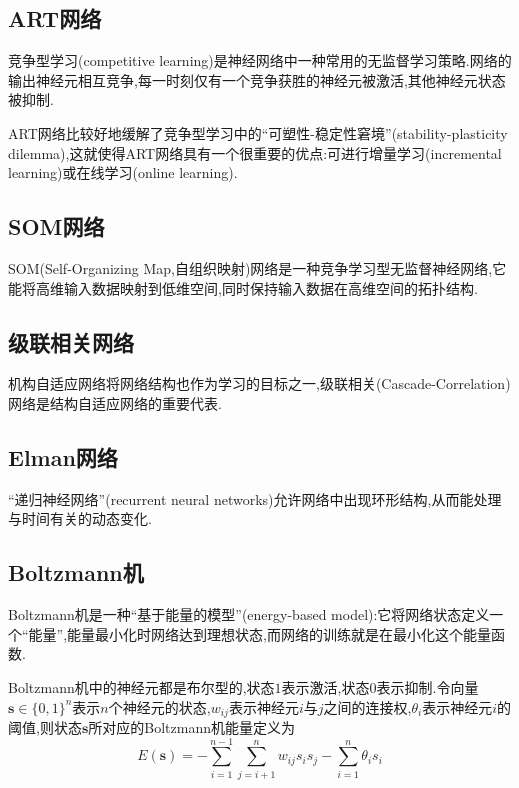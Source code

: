 \subsection{ART网络}

竞争型学习(competitive learning)是神经网络中一种常用的无监督学习策略.网络的输出神经元相互竞争,每一时刻仅有一个竞争获胜的神经元被激活,其他神经元状态被抑制.

ART网络比较好地缓解了竞争型学习中的``可塑性-稳定性窘境''(stability-plasticity dilemma),这就使得ART网络具有一个很重要的优点:可进行增量学习(incremental learning)或在线学习(online learning).

\subsection{SOM网络}

SOM(Self-Organizing Map,自组织映射)网络是一种竞争学习型无监督神经网络,它能将高维输入数据映射到低维空间,同时保持输入数据在高维空间的拓扑结构.

\subsection{级联相关网络}

机构自适应网络将网络结构也作为学习的目标之一,级联相关(Cascade-Correlation)网络是结构自适应网络的重要代表.

\subsection{Elman网络}

``递归神经网络''(recurrent neural networks)允许网络中出现环形结构,从而能处理与时间有关的动态变化.

\subsection{Boltzmann机}

Boltzmann机是一种``基于能量的模型''(energy-based model):它将网络状态定义一个``能量'',能量最小化时网络达到理想状态,而网络的训练就是在最小化这个能量函数.

Boltzmann机中的神经元都是布尔型的,状态$1$表示激活,状态$0$表示抑制.令向量$\mathbf s\in\{0,1\}^n$表示$n$个神经元的状态,$w_{ij}$表示神经元$i$与$j$之间的连接权,$\theta_i$表示神经元$i$的阈值,则状态$\mathbf s$所对应的Boltzmann机能量定义为
\begin{equation}
E(\mathbf s)=-\sum_{i=1}^{n-1}\sum_{j=i+1}^nw_{ij}s_is_j-\sum_{i=1}^n\theta_is_i\end{equation}

